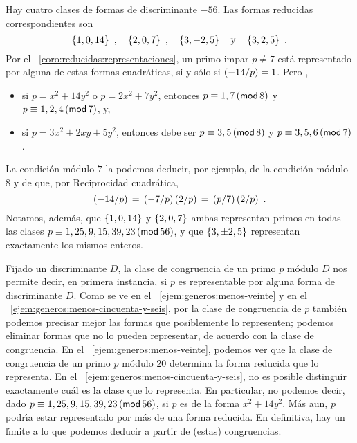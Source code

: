\begin{ejemGeneros}\label{ejem:generos:menos-cincuenta-y-seis}
	Hay cuatro clases de formas de discriminante $-56$. Las formas
	reducidas correspondientes son
	\begin{displaymath}
		\binaria{1,0,14} \dispcomma\quad
		\binaria{2,0,7} \dispcomma\quad
		\binaria{3,-2,5} \dispand
		\binaria{3,2,5}
		\dispstop
	\end{displaymath}
	Por el \coroname~\ref{coro:reducidas:representaciones},
	un primo impar $p\neq 7$ est\'a representado por alguna de estas
	formas cuadr\'aticas, si y s\'olo si $\tlegendre{-14} p=1$. Pero
	\quedacomoejercicio,
	\begin{itemize}
		\item si $p=x^2+14y^2$ o $p=2x^2+7y^2$, entonces
			$p\equiv 1,7\tmodulo[8]$ y
			$p\equiv 1,2,4\tmodulo[7]$, y,
		\item si $p=3x^2\pm 2xy+5y^2$, entonces debe ser
			$p\equiv 3,5\tmodulo[8]$ y
			$p\equiv 3,5,6\tmodulo[7]$.
	\end{itemize}
	La condici\'on m\'odulo $7$ la podemos deducir, por ejemplo, de la
	condici\'on m\'odulo $8$ y de que, por Reciprocidad cuadr\'atica,
	\begin{displaymath}
		\tlegendre{-14} p\,=\,\tlegendre{-7} p\tlegendre 2 p\,=\,
			\tlegendre p 7\tlegendre 2 p
		\dispstop
	\end{displaymath}
	Notamos, adem\'as, que $\binaria{1,0,14}$ y $\binaria{2,0,7}$ ambas
	representan primos en todas las clases
	$p\equiv 1,25,9,15,39,23\tmodulo[56]$,
	y que $\binaria{3,\pm 2,5}$ representan exactamente los mismos
	enteros.
\end{ejemGeneros}

\begin{obsGeneros}\label{obs:generos:ejemplos}
	Fijado un discriminante $D$, la clase de congruencia de un primo
	$p$ m\'odulo $D$ nos permite decir, en primera instancia,
	si $p$ es representable por alguna forma de discriminante $D$.
	Como se ve en el \ejemname~\ref{ejem:generos:menos-veinte} y en
	el \ejemname~\ref{ejem:generos:menos-cincuenta-y-seis},
	por la clase de congruencia de $p$ tambi\'en podemos precisar
	mejor las formas que posiblemente lo representen; podemos eliminar
	formas que no lo pueden representar, de acuerdo con la clase
	de congruencia.
	En el \ejemname~\ref{ejem:generos:menos-veinte},
	podemos ver que la clase de congruencia de un primo $p$ m\'odulo $20$
	determina la forma reducida que lo representa.
	En el \ejemname~\ref{ejem:generos:menos-cincuenta-y-seis},
	no es posible distinguir exactamente cu\'al es la clase
	que lo representa. En particular, no podemos decir, dado
	$p\equiv 1,25,9,15,39,23\tmodulo[56]$, si $p$ es de la forma
	$x^2+14y^2$. M\'as aun, $p$ podr\'{\i}a estar %
	representado por m\'as de una forma reducida.
	En definitiva, hay un l\'{\i}mite a lo que podemos deducir a partir
	de (estas) congruencias.
\end{obsGeneros}


